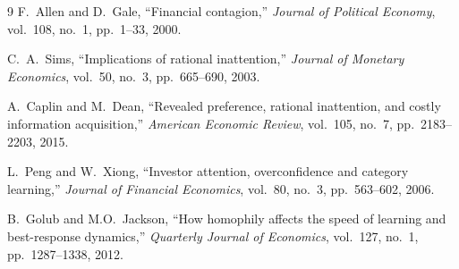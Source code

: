 \documentclass[10pt,twocolumn]{article}
\begin{document}
\begin{thebibliography}{9}
F.~Allen and D.~Gale, ``Financial contagion,''
\textit{Journal of Political Economy}, vol.~108, no.~1,
pp.~1--33, 2000.

C.~A.~Sims, ``Implications of rational inattention,''
\textit{Journal of Monetary Economics}, vol.~50, no.~3,
pp.~665--690, 2003.

A.~Caplin and M.~Dean, ``Revealed preference, rational inattention,
and costly information acquisition,'' \textit{American Economic Review},
vol.~105, no.~7, pp.~2183--2203, 2015.

L.~Peng and W.~Xiong, ``Investor attention, overconfidence and category
learning,'' \textit{Journal of Financial Economics}, vol.~80, no.~3,
pp.~563--602, 2006.

B.~Golub and M.O.~Jackson, ``How homophily affects the speed of learning
and best-response dynamics,''
\textit{Quarterly Journal of Economics}, vol.~127, no.~1,
pp.~1287--1338, 2012.
\end{thebibliography}
\end{document}
